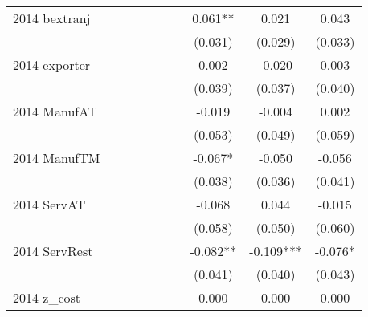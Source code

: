 \begin{table}[htbp]
\begin{tabular}{l*{9}{c}}
2014 bextranj       &               &               &               &               &               &               &       0.061** &       0.021   &       0.043   \\
                    &               &               &               &               &               &               &     (0.031)   &     (0.029)   &     (0.033)   \\
2014 exporter       &               &               &               &               &               &               &       0.002   &      -0.020   &       0.003   \\
                    &               &               &               &               &               &               &     (0.039)   &     (0.037)   &     (0.040)   \\
2014 ManufAT        &               &               &               &               &               &               &      -0.019   &      -0.004   &       0.002   \\
                    &               &               &               &               &               &               &     (0.053)   &     (0.049)   &     (0.059)   \\
2014 ManufTM        &               &               &               &               &               &               &      -0.067*  &      -0.050   &      -0.056   \\
                    &               &               &               &               &               &               &     (0.038)   &     (0.036)   &     (0.041)   \\
2014 ServAT         &               &               &               &               &               &               &      -0.068   &       0.044   &      -0.015   \\
                    &               &               &               &               &               &               &     (0.058)   &     (0.050)   &     (0.060)   \\
2014 ServRest       &               &               &               &               &               &               &      -0.082** &      -0.109***&      -0.076*  \\
                    &               &               &               &               &               &               &     (0.041)   &     (0.040)   &     (0.043)   \\
2014 z\_cost         &               &               &               &               &               &               &       0.000   &       0.000   &       0.000   \\

\end{tabular}
\end{table}
